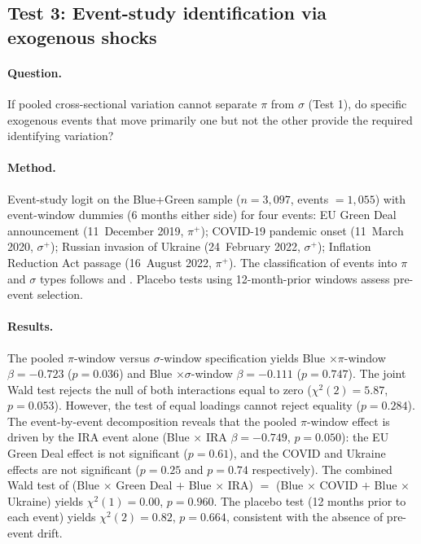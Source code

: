 \subsection*{Test 3: Event-study identification via exogenous shocks}

\paragraph{Question.} If pooled cross-sectional variation cannot separate $\pi$ from $\sigma$ (Test 1), do specific exogenous events that move primarily one but not the other provide the required identifying variation?

\paragraph{Method.} Event-study logit on the Blue+Green sample ($n=3{,}097$, events $=1{,}055$) with event-window dummies (6 months either side) for four events: EU Green Deal announcement (11~December 2019, $\pi^+$); COVID-19 pandemic onset (11~March 2020, $\sigma^+$); Russian invasion of Ukraine (24~February 2022, $\sigma^+$); Inflation Reduction Act passage (16~August 2022, $\pi^+$). The classification of events into $\pi$ and $\sigma$ types follows \cite{baker2016measuring} and \cite{berestycki2025climate}. Placebo tests using 12-month-prior windows assess pre-event selection.

\paragraph{Results.} The pooled $\pi$-window versus $\sigma$-window specification yields Blue $\times \pi$-window $\beta = -0.723$ ($p = 0.036$) and Blue $\times \sigma$-window $\beta = -0.111$ ($p = 0.747$). The joint Wald test rejects the null of both interactions equal to zero ($\chi^2(2) = 5.87$, $p = 0.053$). However, the test of equal loadings cannot reject equality ($p = 0.284$). The event-by-event decomposition reveals that the pooled $\pi$-window effect is driven by the IRA event alone (Blue $\times$ IRA $\beta = -0.749$, $p = 0.050$): the EU Green Deal effect is not significant ($p = 0.61$), and the COVID and Ukraine effects are not significant ($p = 0.25$ and $p = 0.74$ respectively). The combined Wald test of (Blue $\times$ Green Deal $+$ Blue $\times$ IRA) $=$ (Blue $\times$ COVID $+$ Blue $\times$ Ukraine) yields $\chi^2(1) = 0.00$, $p = 0.960$. The placebo test (12 months prior to each event) yields $\chi^2(2) = 0.82$, $p = 0.664$, consistent with the absence of pre-event drift.

